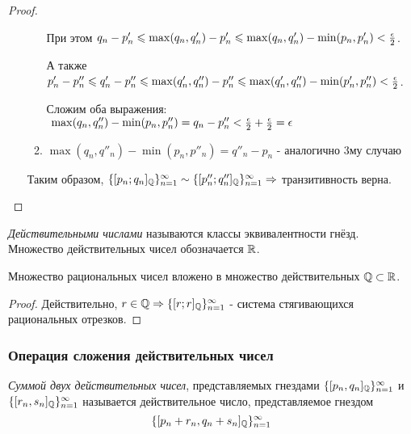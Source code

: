 \begin{proof}
\begin{itemize}
\begin{enumerate}
                    При этом $q_n - p'_n \leqslant \max(q_n, q'_n) - p'_n \leqslant
                    \max(q_n, q'_n) - \min(p_n, p'_n) < \frac{\epsilon}{2}$.
                    
                    А также $p'_n - p''_n \leqslant q'_n - p''_n \leqslant \max(q'_n, q''_n) - p''_n
                    \leqslant \max(q'_n, q''_n) - \min(p'_n, p''_n) < \frac{\epsilon}{2}$.
                
                    Сложим оба выражения:
                    $\ \max(q_n, q''_n) - \min(p_n, p''_n) = q_n - p''_n
                    < \frac{\epsilon}{2} + \frac{\epsilon}{2} = \epsilon$
                \item $\max(q_n, q''_n) - \min(p_n, p''_n) = q''_n - p_n$
                    - аналогично 3му случаю
            \end{enumerate}
            Таким образом, $\{[p_n; q_n]_{\mathbb{Q}}\}_{n = 1}^\infty
            \sim \{[p''_n; q''_n]_{\mathbb{Q}}\}_{n = 1}^\infty \Rightarrow$
            транзитивность верна.
    \end{itemize}
\end{proof}

\begin{definition}
    \textit{Действительными числами} называются
    классы эквивалентности гнёзд. Множество действительных
    чисел обозначается $\mathbb{R}$.
\end{definition}

\begin{proposition}
    Множество рациональных чисел вложено в множество
    действительных $\mathbb{Q} \subset \mathbb{R}$.
\end{proposition}

\begin{proof}
    Действительно, $r \in \mathbb{Q} \Rightarrow \{[r;r]_{\mathbb{Q}}\}_{n = 1}^\infty$
    - система стягивающихся рациональных отрезков.
\end{proof}

\subsubsection*{Операция сложения действительных чисел}

\begin{definition}
    \textit{Суммой двух действительных чисел}, представляемых
    гнездами $\{[p_n, q_n]_{\mathbb{Q}}\}_{n = 1}^{\infty}$ и
    $\{[r_n, s_n]_{\mathbb{Q}}\}_{n = 1}^{\infty}$ называется
    действительное число, представляемое гнездом
    \[
        \{[p_n + r_n, q_n + s_n]_{\mathbb{Q}}\}_{n = 1}^{\infty}
    \] 
\end{definition}

